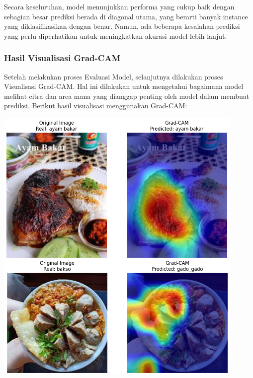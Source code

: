 Secara keseluruhan, model menunjukkan performa yang cukup baik dengan sebagian besar prediksi berada di diagonal utama, yang berarti banyak instance yang diklasifikasikan dengan benar. Namun, ada beberapa kesalahan prediksi yang perlu diperhatikan untuk meningkatkan akurasi model lebih lanjut.

\subsubsection{Hasil Visualisasi Grad-CAM}
Setelah melakukan proses Evaluasi Model, selanjutnya dilakukan proses Visualisasi Grad-CAM. Hal ini dilakukan untuk mengetahui bagaimana model melihat citra dan area mana yang dianggap penting oleh model dalam membuat prediksi. Berikut hasil visualisasi menggunakan Grad-CAM:

\begin{afigure}
    \includegraphics[width=0.9\textwidth, center]{images/grad-cam-1-dgx.png}
    \label{fig:grad-cam-1-dgx}
\end{afigure}
\clearpage
